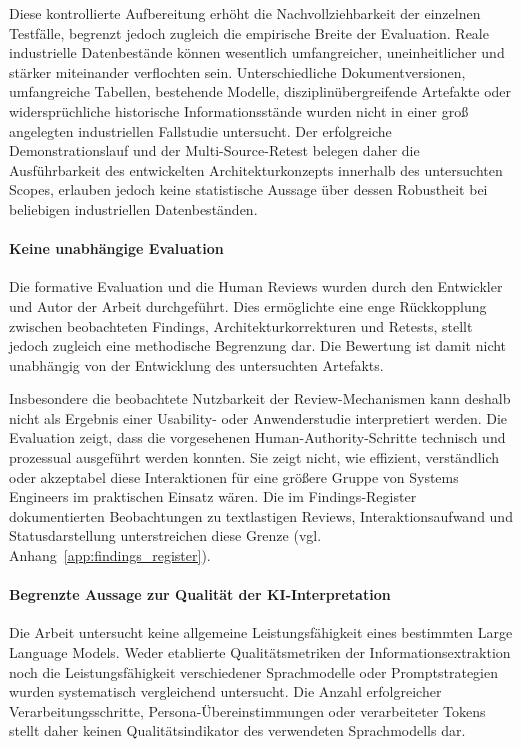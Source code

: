 Diese kontrollierte Aufbereitung erhöht die Nachvollziehbarkeit der einzelnen
Testfälle, begrenzt jedoch zugleich die empirische Breite der Evaluation.
Reale industrielle Datenbestände können wesentlich umfangreicher,
uneinheitlicher und stärker miteinander verflochten sein. Unterschiedliche
Dokumentversionen, umfangreiche Tabellen, bestehende Modelle,
disziplinübergreifende Artefakte oder widersprüchliche historische
Informationsstände wurden nicht in einer groß angelegten industriellen
Fallstudie untersucht. Der erfolgreiche Demonstrationslauf und der
Multi-Source-Retest belegen daher die Ausführbarkeit des entwickelten
Architekturkonzepts innerhalb des untersuchten Scopes, erlauben jedoch keine
statistische Aussage über dessen Robustheit bei beliebigen industriellen
Datenbeständen.

\paragraph{Keine unabhängige Evaluation}

Die formative Evaluation und die Human Reviews wurden durch den Entwickler
und Autor der Arbeit durchgeführt. Dies ermöglichte eine enge Rückkopplung
zwischen beobachteten Findings, Architekturkorrekturen und Retests, stellt
jedoch zugleich eine methodische Begrenzung dar. Die Bewertung ist damit
nicht unabhängig von der Entwicklung des untersuchten Artefakts.

Insbesondere die beobachtete Nutzbarkeit der Review-Mechanismen kann deshalb
nicht als Ergebnis einer Usability- oder Anwenderstudie interpretiert werden.
Die Evaluation zeigt, dass die vorgesehenen Human-Authority-Schritte
technisch und prozessual ausgeführt werden konnten. Sie zeigt nicht, wie
effizient, verständlich oder akzeptabel diese Interaktionen für eine größere
Gruppe von Systems Engineers im praktischen Einsatz wären. Die im
Findings-Register dokumentierten Beobachtungen zu textlastigen Reviews,
Interaktionsaufwand und Statusdarstellung unterstreichen diese Grenze
(vgl. Anhang~\ref{app:findings_register}).

\paragraph{Begrenzte Aussage zur Qualität der KI-Interpretation}

Die Arbeit untersucht keine allgemeine Leistungsfähigkeit eines bestimmten
Large Language Models. Weder etablierte Qualitätsmetriken der Informationsextraktion noch die
Leistungsfähigkeit verschiedener Sprachmodelle oder Promptstrategien wurden
systematisch vergleichend untersucht. Die Anzahl erfolgreicher Verarbeitungsschritte,
Persona-Übereinstimmungen oder verarbeiteter Tokens stellt daher keinen
Qualitätsindikator des verwendeten Sprachmodells dar.

